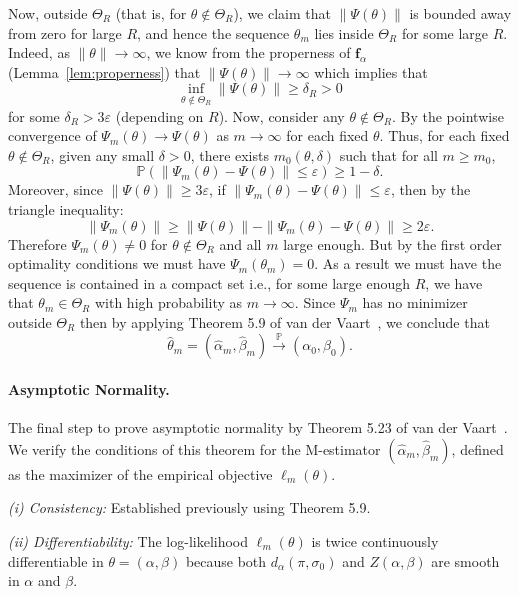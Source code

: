 \documentclass{article}
\renewcommand{\P}{\mathbb{P}}
\begin{document}
Now, outside \(\Theta_R\) (that is, for \(\theta\notin\Theta_R\)), we claim that \(\|\Psi(\theta)\|\) is bounded away from zero for large \(R\), and hence the sequence $\theta_m$ lies inside $\Theta_R$ for some large $R$.
Indeed, as \(\|\theta\|\to\infty\), we know from the properness of \(\boldsymbol{f}_\alpha\)  (Lemma~\ref{lem:properness}) that \(\|\Psi(\theta)\|\to\infty\) which implies that
\[
\inf_{\theta\notin\Theta_R} \|\Psi(\theta)\| \geq \delta_R > 0
\]
for some \(\delta_R > 3\varepsilon\) (depending on \(R\)).
Now, consider any \(\theta\notin\Theta_R\).
By the pointwise convergence of \(\Psi_m(\theta) \to \Psi(\theta)\) as \(m\to\infty\) for each fixed \(\theta\).
Thus, for each fixed \(\theta\notin\Theta_R\),  
given any small \(\delta > 0\), there exists \(m_0(\theta,\delta)\) such that for all \(m \geq m_0\),
\[
\mathbb{P}\left( \|\Psi_m(\theta) - \Psi(\theta)\| \leq \varepsilon \right) \geq 1-\delta.
\]
Moreover, since \(\|\Psi(\theta)\| \geq 3\varepsilon\),  
if \(\|\Psi_m(\theta) - \Psi(\theta)\| \leq \varepsilon\), then by the triangle inequality:
\[
\|\Psi_m(\theta)\| \geq \|\Psi(\theta)\| - \|\Psi_m(\theta) - \Psi(\theta)\| \geq 2\varepsilon.
\]
Therefore $\Psi_m(\theta)\neq 0$ for $\theta\not\in \Theta_R$ and all $m$ large enough. But by the first order optimality conditions we must have $\Psi_m(\theta_m)=0$. As a result we must have the sequence is contained in a compact set  i.e., for some large enough $R$, we have that $\theta_m\in\Theta_R$ with high probability as $m\to \infty$. Since $\Psi_m$ has no minimizer outside $\Theta_R$ then by applying Theorem 5.9 of van der Vaart~\cite{van2000asymptotic}, we conclude that
\[
\hat\theta_m = (\hat\alpha_m, \hat\beta_m) \xrightarrow{\P} (\alpha_0, \beta_0).
\]

\paragraph{Asymptotic Normality.} The final step to prove asymptotic normality by  Theorem 5.23 of van der Vaart~\cite{van2000asymptotic}. We verify the conditions of this theorem for the M-estimator \((\hat\alpha_m, \hat\beta_m)\), defined as the maximizer of the empirical objective \(\ell_m(\theta)\). 

\textit{(i) Consistency:} Established previously using Theorem 5.9.

\textit{(ii) Differentiability:} The log-likelihood \(\ell_m(\theta)\) is twice continuously differentiable in \(\theta = (\alpha, \beta)\) because both \(d_\alpha(\pi, \sigma_0)\) and \(Z(\alpha, \beta)\) are smooth in \(\alpha\) and \(\beta\).
\end{document}
